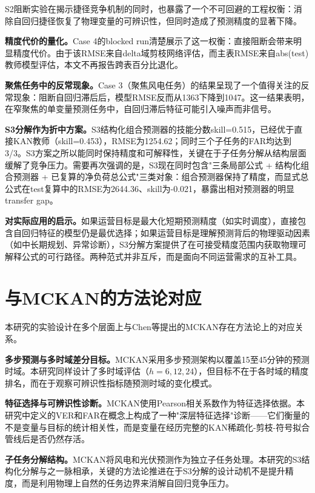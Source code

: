 S2阻断实验在揭示捷径竞争机制的同时，也暴露了一个不可回避的工程权衡：消除自回归捷径恢复了物理变量的可辨识性，但同时造成了预测精度的显著下降。

\textbf{精度代价的量化。}Case 4的blocked run清楚展示了这一权衡：直接阻断会带来明显精度代价。由于该RMSE来自delta域剪枝网络评估，而主表RMSE来自abs(test)教师模型评估，本文不再报告跨表百分比退化。

\textbf{聚焦任务中的反常现象。}Case 3（聚焦风电任务）的结果呈现了一个值得关注的反常现象：阻断自回归滞后后，模型RMSE反而从1363下降到1047。这一结果表明，在窄聚焦的单变量预测任务中，自回归滞后特征可能引入噪声而非信号。

\textbf{S3分解作为折中方案。}S3结构化组合预测器的技能分数skill=0.515，已经优于直接KAN教师（skill=0.453），RMSE为1254.62；同时三个子任务的FAR均达到3/3。S3方案之所以能同时保持精度和可解释性，关键在于子任务分解从结构层面缓解了竞争压力。需要再次强调的是，S3现在同时包含"三条局部公式 + 结构化组合预测器 + 已复算的净负荷总公式"三类对象：组合预测器保持了精度，而显式总公式在test复算中的RMSE为2644.36、skill为-0.021，暴露出相对预测器的明显transfer gap。

\textbf{对实际应用的启示。}如果运营目标是最大化短期预测精度（如实时调度），直接包含自回归特征的模型仍是最优选择；如果运营目标是理解预测背后的物理驱动因素（如中长期规划、异常诊断），S3分解方案提供了在可接受精度范围内获取物理可解释公式的可行路径。两种范式并非互斥，而是面向不同运营需求的互补工具。

\section{与MCKAN的方法论对应}

本研究的实验设计在多个层面上与Chen等\cite{chen2025mckan}提出的MCKAN存在方法论上的对应关系。

\textbf{多步预测与多时域差分目标。}MCKAN采用多步预测架构以覆盖15至45分钟的预测时域。本研究同样设计了多时域评估（$h=6, 12, 24$），但目标不在于各时域的精度排名，而在于观察可辨识性指标随预测时域的变化模式。

\textbf{特征选择与可辨识性诊断。}MCKAN使用Pearson相关系数作为特征选择依据。本研究中定义的VER和FAR在概念上构成了一种"深层特征选择"诊断——它们衡量的不是变量与目标的统计相关性，而是变量在经历完整的KAN稀疏化-剪枝-符号拟合管线后是否仍然存活。

\textbf{子任务分解结构。}MCKAN将风电和光伏预测作为独立子任务处理。本研究的S3结构化分解与之一脉相承，关键的方法论推进在于S3分解的设计动机不是提升精度，而是利用物理上自然的任务边界来消解自回归竞争压力。

